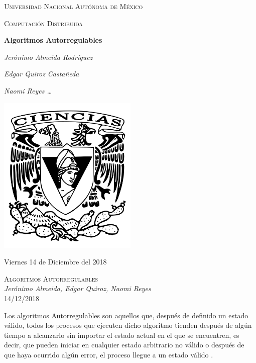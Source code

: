 \documentclass[12pt,a4paper]{article}
\begin{document}
\begin{titlepage}
	\centering
	{\scshape\LARGE Universidad Nacional Autónoma de México \par}
	\vspace{1cm}
	{\scshape\Large Computación Distribuida\par}
	\vspace{1cm}
	{\huge\bfseries Algoritmos Autorregulables\par}
	\vspace{1cm}
    {\Large\itshape Jerónimo Almeida Rodríguez \par}
    \vspace{.5cm}
	{\Large\itshape Edgar Quiroz Castañeda \par}
    \vspace{.5cm}
	{\Large\itshape Naomi Reyes \dots \par}
	\vfill
	\includegraphics[width=0.5\textwidth]{escudo_f-ciencias.png}
	\vfill

	{\large Viernes 14 de Diciembre del 2018 \par}
\end{titlepage}

	\pagebreak
	\setlength{\voffset}{-0.75in}
	\setlength{\headsep}{5pt}


\begin{center}
		\textsc{\huge Algoritmos Autorregulables\\}
		\textit{Jerónimo Almeida, Edgar Quiroz, Naomi Reyes\\}
        14/12/2018
\end{center}

Los algoritmos Autorregulables son aquellos que, después de definido un estado
válido, todos los procesos que ejecuten dicho algoritmo tienden después de
algún tiempo a alcanzarlo sin importar el estado actual en el que se encuentren,
es decir, que pueden iniciar en cualquier estado arbitrario no válido o después
de que haya ocurrido algún error, el proceso llegue a un estado válido .
\end{document}
